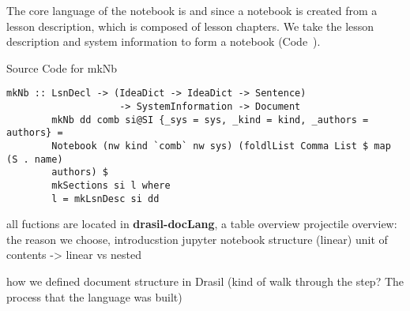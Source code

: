 The core language of the notebook is  and 
 since a notebook is created from a lesson description, 
which is composed of lesson chapters. We take the lesson description and system 
information to form a notebook (Code~).

\begin{listing}[h]
	\caption{Source Code for mkNb}
	\label{code:mkNb}
	\begin{lstlisting}[language=haskell1]
		mkNb :: LsnDecl -> (IdeaDict -> IdeaDict -> Sentence) 
					-> SystemInformation -> Document
		mkNb dd comb si@SI {_sys = sys, _kind = kind, _authors = authors} =
		Notebook (nw kind `comb` nw sys) (foldlList Comma List $ map (S . name) 
		authors) $
		mkSections si l where
		l = mkLsnDesc si dd
	\end{lstlisting}
\end{listing}


all fuctions are located in \textbf{drasil-docLang}, a table overview
projectile overview: the reason we choose, introducstion
jupyter notebook structure (linear)
unit of contents -> linear vs nested

how we defined document structure in Drasil (kind of walk through the step? The 
process that the language was built)


